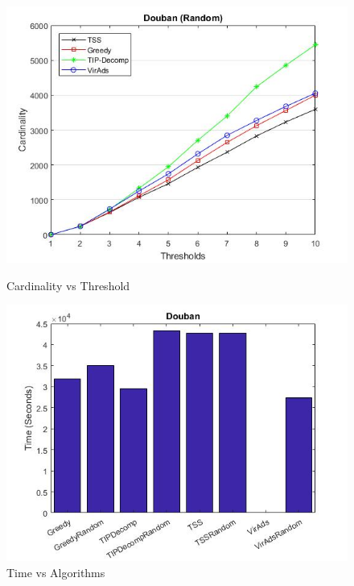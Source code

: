 \begin{figure}[h!]
\begin{minipage}[t]{0.50\textwidth}
\includegraphics[width=\linewidth,keepaspectratio=true]{images/doubanresultrandom.jpg}
\caption{Cardinality vs Threshold}

\end{minipage}
\begin{minipage}[t]{0.50\textwidth}
\includegraphics[width=\linewidth,keepaspectratio=true]{images/doubantime1.jpg}
\caption{Time vs Algorithms}
\end{minipage}
\end{figure}

